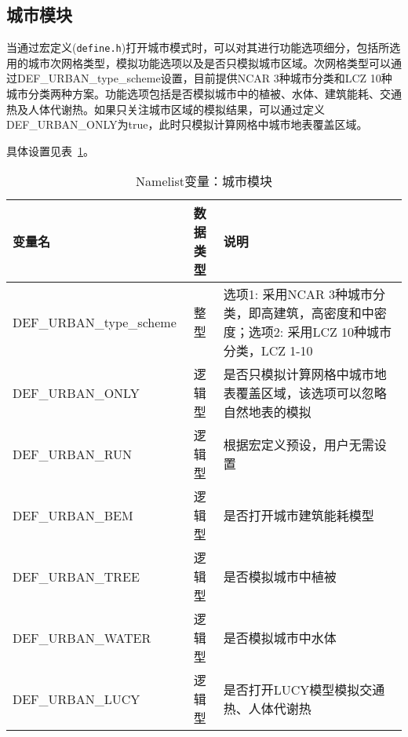 \documentclass[a4paper,12pt,twoside]{article}
\begin{document}
\subsection{城市模块}

当通过宏定义(\texttt {define.h})打开城市模式时，可以对其进行功能选项细分，包括所选用的城市次网格类型，模拟功能选项以及是否只模拟城市区域。次网格类型可以通过DEF\_URBAN\_type\_scheme设置，目前提供NCAR 3种城市分类和LCZ 10种城市分类两种方案。功能选项包括是否模拟城市中的植被、水体、建筑能耗、交通热及人体代谢热。如果只关注城市区域的模拟结果，可以通过定义DEF\_URBAN\_ONLY为true，此时只模拟计算网格中城市地表覆盖区域。

具体设置见表~\ref{table_nl_urban}。
\begin{table}[!htb]
\caption{Namelist变量：城市模块}
\label{table_nl_urban}
\centering \renewcommand{\arraystretch}{1.5}
\begin{tabular}{lcp{}}
\toprule
\textbf{变量名} & \textbf{数据类型} & \textbf{说明}\\\midrule
DEF\_URBAN\_type\_scheme & 整型 & 选项1: 采用NCAR 3种城市分类，即高建筑，高密度和中密度；选项2: 采用LCZ 10种城市分类，LCZ 1-10\\
DEF\_URBAN\_ONLY & 逻辑型 & 是否只模拟计算网格中城市地表覆盖区域，该选项可以忽略自然地表的模拟\\
DEF\_URBAN\_RUN & 逻辑型 & 根据宏定义预设，用户无需设置\\
DEF\_URBAN\_BEM & 逻辑型 & 是否打开城市建筑能耗模型\\
DEF\_URBAN\_TREE & 逻辑型 & 是否模拟城市中植被\\
DEF\_URBAN\_WATER & 逻辑型 & 是否模拟城市中水体\\
DEF\_URBAN\_LUCY & 逻辑型 & 是否打开LUCY模型模拟交通热、人体代谢热\\
\bottomrule
\end{tabular} 
\end{table}
\clearpage
\end{document}
